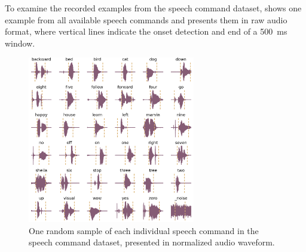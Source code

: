 To examine the recorded examples from the speech command dataset,  shows one example from all available speech commands and presents them in raw audio format, where vertical lines indicate the onset detection and end of a \SI{500}{\milli\second} window.
\begin{figure}[!ht]
  \centering
    \includegraphics[width=0.65\textwidth]{./5_exp/figs/exp_dataset_speech_cmd_wav_grid.png}
  \caption{One random sample of each individual speech command in the speech command dataset, presented in normalized audio waveform.}
  \label{fig:exp_dataset_speech_cmd_wav_grid}
\end{figure}
\FloatBarrier
\noindent




